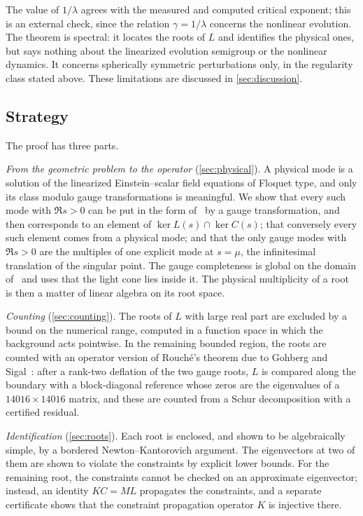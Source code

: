 The value of $1/\lambda$ agrees with the measured and computed critical exponent; this is an external check, since
the relation $\gamma=1/\lambda$ concerns the nonlinear evolution. The theorem is spectral: it locates the roots of
$L$ and identifies the physical ones, but says nothing about the linearized evolution semigroup or the nonlinear
dynamics. It concerns spherically symmetric perturbations only, in the regularity class stated above. These
limitations are discussed in \cref{sec:discussion}.

\subsection{Strategy}

The proof has three parts.

\emph{From the geometric problem to the operator} (\cref{sec:physical}). A physical mode is a solution of the
linearized Einstein--scalar field equations of Floquet type, and only its class modulo gauge transformations is
meaningful. We show that every such mode with $\Re s>0$ can be put in the form of~\cite{RT2019} by a gauge
transformation, and then corresponds to an element of $\ker L(s)\cap\ker C(s)$; that conversely every such element
comes from a physical mode; and that the only gauge modes with $\Re s>0$ are the multiples of one explicit mode at
$s=\mu$, the infinitesimal translation of the singular point. The gauge completeness is global on the domain
of~\cite{RT2019} and uses that the light cone lies inside it. The physical multiplicity of a root is then a matter
of linear algebra on its root space.

\emph{Counting} (\cref{sec:counting}). The roots of $L$ with large real part are excluded by a bound on the
numerical range, computed in a function space in which the background acts pointwise. In the remaining bounded
region, the roots are counted with an operator version of Rouch\'e's theorem due to Gohberg and
Sigal~\cite{GohbergSigal1971}: after a rank-two deflation of the two gauge roots, $L$ is compared along the
boundary with a block-diagonal reference whose zeros are the eigenvalues of a $14016\times14016$ matrix, and these
are counted from a Schur decomposition with a certified residual.

\emph{Identification} (\cref{sec:roots}). Each root is enclosed, and shown to be algebraically simple, by a bordered
Newton--Kantorovich argument. The eigenvectors at two of them are shown to violate the constraints by explicit lower
bounds. For the remaining root, the constraints cannot be checked on an approximate eigenvector; instead, an
identity $KC=ML$ propagates the constraints, and a separate certificate shows that the constraint propagation
operator $K$ is injective there.


